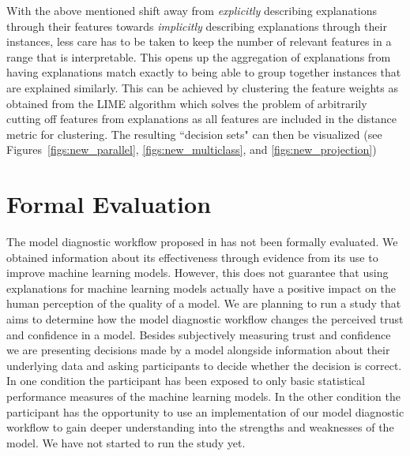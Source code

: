 

With the above mentioned shift away from \emph{explicitly} describing explanations through their features towards \emph{implicitly} describing explanations through their instances, less care has to be taken to keep the number of relevant features in a range that is interpretable.
This opens up the aggregation of explanations from having explanations match exactly to being able to group together instances that are explained similarly.
This can be achieved by clustering the feature weights as obtained from the LIME algorithm which solves the problem of arbitrarily cutting off features from explanations as all features are included in the distance metric for clustering.
The resulting ``decision sets" can then be visualized (see Figures~\ref{figs:new_parallel}, \ref{figs:new_multiclass}, and \ref{figs:new_projection})
\vspace*{-0.5em}

\section{Formal Evaluation}
The model diagnostic workflow proposed in  has not been formally evaluated.
We obtained information about its effectiveness through evidence from its use to improve machine learning models.
However, this does not guarantee that using explanations for machine learning models actually have a positive impact on the human perception of the quality of a model.
We are planning to run a study that aims to determine how the model diagnostic workflow changes the perceived trust and confidence in a model.
Besides subjectively measuring trust and confidence we are presenting decisions made by a model alongside information about their underlying data and asking participants to decide whether the decision is correct.
In one condition the participant has been exposed to only basic statistical performance measures of the machine learning models.
In the other condition the participant has the opportunity to use an implementation of our model diagnostic workflow to gain deeper understanding into the strengths and weaknesses of the model.
We have not started to run the study yet.


